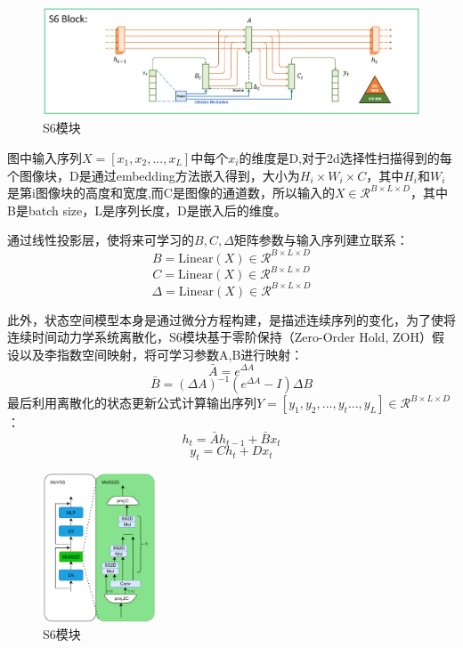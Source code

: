 \documentclass[UTF8,12pt, AutoFakeBold,fontset = founder]{ctexart}
\begin{document}
\begin{figure}[H]
    \centering
    \includegraphics[width=\textwidth]{../images/S6.png}
    \caption{S6模块}
    \label{fig:S6}
\end{figure}

图中输入序列$X=[x_{1}, x_{2}, ..., x_{L}]$中每个$x_{i}$的维度是D,对于2d选择性扫描得到的每个图像块，D是通过embedding方法嵌入得到，大小为$ H_{i} \times W_{i} \times C$，其中$H_{i}$和$W_{i}$是第i图像块的高度和宽度,而C是图像的通道数，所以输入的$X \in \mathcal{R}^{B \times L \times D}$，其中B是batch size，L是序列长度，D是嵌入后的维度。

通过线性投影层，使将来可学习的$B,C,\Delta$矩阵参数与输入序列建立联系：
$$
B = \text{Linear}(X) \in \mathcal{R}^{B \times L \times D}
$$
$$
C = \text{Linear}(X) \in \mathcal{R}^{B \times L \times D}
$$
$$
\Delta = \text{Linear}(X) \in \mathcal{R}^{B \times L \times D}
$$

此外，状态空间模型本身是通过微分方程构建，是描述连续序列的变化，为了使将连续时间动力学系统离散化，S6模块基于零阶保持（Zero-Order Hold, ZOH）假设以及李指数空间映射，将可学习参数A,B进行映射：
$$
\bar{A} = e^{\Delta A}
$$
$$
\bar{B} = (\Delta A)^{-1} (e^{\Delta A} - I) \Delta B
$$
最后利用离散化的状态更新公式计算输出序列$Y=[y_1, y_2, ...,y_t ..., y_L] \in \mathcal{R}^{B \times L \times D}$：
$$
h_t = \bar{A} h_{t-1} + \bar{B} x_t
$$
$$
y_t = C h_{t} + D x_t
$$

\begin{figure}[H]
    \centering
    \includegraphics[width=0.3\textwidth]{../images/MoSS2D.png}
    \caption{S6模块}
    \label{fig:MoSSD}
\end{figure}
\end{document}
